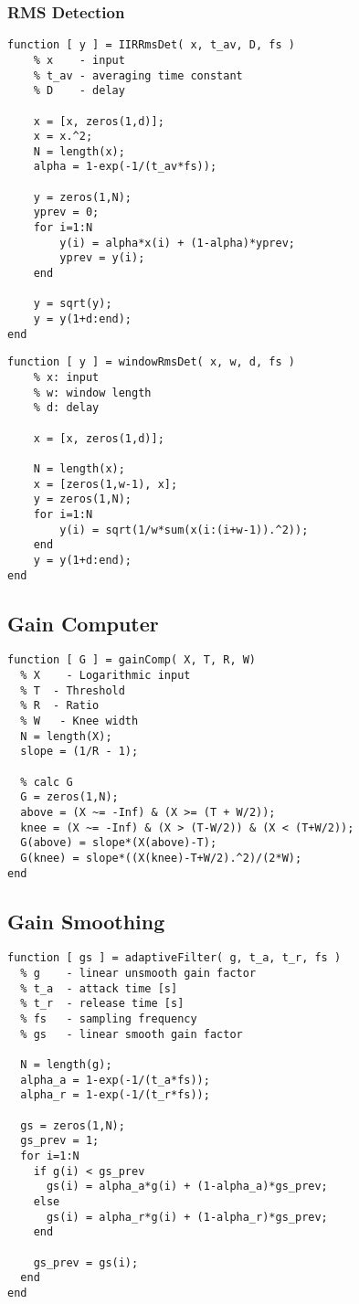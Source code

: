 \documentclass[../main2.tex]{subfiles}
\begin{document}
\subsubsection{RMS Detection}
\begin{lstlisting}[style=customc]
function [ y ] = IIRRmsDet( x, t_av, D, fs )
    % x    - input
    % t_av - averaging time constant
    % D    - delay
    
    x = [x, zeros(1,d)];
    x = x.^2;
    N = length(x);
    alpha = 1-exp(-1/(t_av*fs));
    
    y = zeros(1,N);
    yprev = 0;
    for i=1:N
        y(i) = alpha*x(i) + (1-alpha)*yprev;
        yprev = y(i);
    end
    
    y = sqrt(y);
    y = y(1+d:end);
end
\end{lstlisting}
\begin{lstlisting}[style=customc]
function [ y ] = windowRmsDet( x, w, d, fs )
    % x: input
    % w: window length
    % d: delay
    
    x = [x, zeros(1,d)];
    
    N = length(x);
    x = [zeros(1,w-1), x];
    y = zeros(1,N);
    for i=1:N
        y(i) = sqrt(1/w*sum(x(i:(i+w-1)).^2));
    end
    y = y(1+d:end);
end
\end{lstlisting}
\subsection{Gain Computer}
\begin{lstlisting}[style=customc]
function [ G ] = gainComp( X, T, R, W)
  % X    - Logarithmic input 
  % T  - Threshold
  % R  - Ratio
  % W   - Knee width
  N = length(X);
  slope = (1/R - 1);
    
  % calc G
  G = zeros(1,N);
  above = (X ~= -Inf) & (X >= (T + W/2));
  knee = (X ~= -Inf) & (X > (T-W/2)) & (X < (T+W/2));
  G(above) = slope*(X(above)-T);
  G(knee) = slope*((X(knee)-T+W/2).^2)/(2*W);
end
\end{lstlisting}


\subsection{Gain Smoothing}

\begin{lstlisting}[style=customc]
function [ gs ] = adaptiveFilter( g, t_a, t_r, fs )
  % g    - linear unsmooth gain factor
  % t_a  - attack time [s]
  % t_r  - release time [s]
  % fs   - sampling frequency
  % gs   - linear smooth gain factor

  N = length(g);
  alpha_a = 1-exp(-1/(t_a*fs));
  alpha_r = 1-exp(-1/(t_r*fs));
    
  gs = zeros(1,N);
  gs_prev = 1;
  for i=1:N
    if g(i) < gs_prev
      gs(i) = alpha_a*g(i) + (1-alpha_a)*gs_prev;
    else
      gs(i) = alpha_r*g(i) + (1-alpha_r)*gs_prev;
    end
        
    gs_prev = gs(i);
  end
end
\end{lstlisting}
\end{document}
